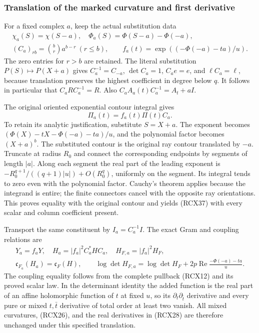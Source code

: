 \subsubsection{Translation of the marked curvature and first derivative}

For a fixed complex \(a\), keep the actual substitution data
\[
\begin{gathered}
 \chi_a(S)=\chi(S-a),\quad
 \Phi_a(S)=\Phi(S-a)-\Phi(-a),\\
 (C_a)_{rb}=\binom br a^{b-r}\ (r\le b),\qquad
 f_a(t)=\exp((-\Phi(-a)-ta)/u).
\end{gathered}\tag{RCX36}
\]
The zero entries for \(r>b\) are retained. The literal substitution
\(P(S)\mapsto P(X+a)\) gives
\(C_a^{-1}=C_{-a}\), \(\det C_a=1\), \(C_ae=e\), and
\(\ell C_a=\ell\), because translation preserves the highest
coefficient in degree below \(q\). It follows in particular that
\(C_aRC_a^{-1}=R\). Also
\(C_aA_a(t)C_a^{-1}=A_t+aI\).

The original oriented exponential contour integral gives
\[
 \Pi_a(t)=f_a(t)\Pi(t)C_a.
 \tag{RCX37}
\]
To retain its analytic justification, substitute \(S=X+a\).
The exponent becomes
\((\Phi(X)-tX-\Phi(-a)-ta)/u\), and the polynomial factor becomes
\((X+a)^b\). The substituted contour is the original ray contour
translated by \(-a\). Truncate at radius \(R_0\) and connect the
corresponding endpoints by segments of length \(|a|\). Along each
segment the real part of the leading exponent is
\(-R_0^{q+1}/((q+1)|u|)+O(R_0^q)\), uniformly on the segment.
Its integral tends to zero even with the polynomial factor.
Cauchy's theorem applies because the integrand is entire; the
finite connectors cancel with the opposite ray orientations.
This proves equality with the original contour and yields
(RCX37) with every scalar and column coefficient present.

Transport the same constituent by \(I_a=C_a^{-1}I\). The exact
Gram and coupling relations are
\[
\begin{gathered}
 Y_a=f_aY,\quad H_a=|f_a|^2C_a^*HC_a,\quad
 H_{F,a}=|f_a|^2H_F,\\
 \mathfrak c_{F_a}(H_a)=\mathfrak c_F(H),\qquad
 \log\det H_{F,a}
 =\log\det H_F+2p\operatorname{Re}\frac{-\Phi(-a)-ta}{u}.
\end{gathered}\tag{RCX38}
\]
The coupling equality follows from the complete pullback
(RCX12) and its proved scalar law. In the determinant identity
the added function is the real part of an affine holomorphic
function of \(t\) at fixed \(u\), so its
\(\partial_t\partial_{\bar t}\) derivative and every pure or mixed
\(t,\bar t\) derivative of total order at least two vanish. All mixed
curvatures, (RCX26), and the real derivatives in (RCX28) are
therefore unchanged under this specified translation.

